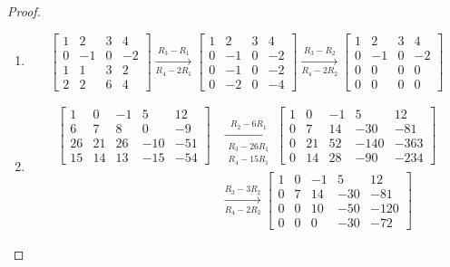 \begin{proof}
    \begin{enumerate}
        \item \begin{equation*}
                  \begin{bmatrix}
                      1 & 2 & 3 & 4 \\0&-1&0&-2\\1&1&3&2\\2&2&6&4
                  \end{bmatrix}\xrightarrow[R_4-2R_1]{R_3-R_1}
                  \begin{bmatrix}
                      1 & 2  & 3 & 4  \\
                      0 & -1 & 0 & -2 \\
                      0 & -1 & 0 & -2 \\
                      0 & -2 & 0 & -4
                  \end{bmatrix}\xrightarrow[R_4-2R_2]{R_3-R_2}
                  \begin{bmatrix}
                      1 & 2  & 3 & 4  \\
                      0 & -1 & 0 & -2 \\
                      0 & 0  & 0 & 0  \\
                      0 & 0  & 0 & 0
                  \end{bmatrix}
              \end{equation*}
        \item \begin{align*}
                  \begin{bmatrix}1&0&-1&5&12\\6&7&8&0&-9\\26&21&26&-10&-51\\15&14&13&-15&-54\end{bmatrix}
                   & \xrightarrow[\substack{R_3-26R_1 \\R_4-15R_1}]{R_2-6R_1}
                  \begin{bmatrix}
                      1 & 0  & -1 & 5    & 12   \\
                      0 & 7  & 14 & -30  & -81  \\
                      0 & 21 & 52 & -140 & -363 \\
                      0 & 14 & 28 & -90  & -234
                  \end{bmatrix}           \\
                   & \xrightarrow[R_4-2R_2]{R_3-3R_2}
                  \begin{bmatrix}
                      1 & 0 & -1 & 5   & 12   \\
                      0 & 7 & 14 & -30 & -81  \\
                      0 & 0 & 10 & -50 & -120 \\
                      0 & 0 & 0  & -30 & -72
                  \end{bmatrix}
              \end{align*}
    \end{enumerate}
\end{proof}

